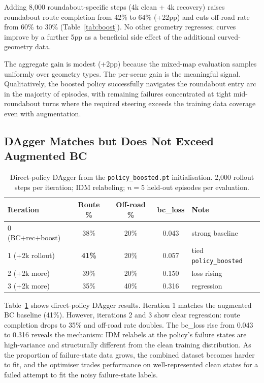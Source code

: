 \documentclass{article}
\begin{document}
Adding 8{,}000 roundabout-specific steps (4k clean + 4k recovery) raises
roundabout route completion from 42\% to 64\% (+22pp) and cuts off-road
rate from 60\% to 30\% (Table~\ref{tab:boost}). No other geometry regresses;
curves improve by a further 5pp as a beneficial side effect of the additional
curved-geometry data.

The aggregate gain is modest (+2pp) because the mixed-map evaluation samples
uniformly over geometry types. The per-scene gain is the meaningful signal.
Qualitatively, the boosted policy successfully navigates the roundabout entry
arc in the majority of episodes, with remaining failures concentrated at
tight mid-roundabout turns where the required steering exceeds the training
data coverage even with augmentation.

\subsection{DAgger Matches but Does Not Exceed Augmented BC}

\begin{table}[t]
\centering
\caption{
  Direct-policy DAgger from the \texttt{policy\_boosted.pt} initialisation.
  2{,}000 rollout steps per iteration; IDM relabeling; $n{=}5$ held-out
  episodes per evaluation.
}
\label{tab:dagger}
\small
\begin{tabular}{lcccl}
\toprule
Iteration & Route \% & Off-road \% & bc\_loss & Note \\
\midrule
0 (BC+rec+boost) & 38\% & 20\% & 0.043 & strong baseline \\
1 (+2k rollout)  & \textbf{41\%} & 20\% & 0.057 & tied \texttt{policy\_boosted} \\
2 (+2k more)     & 39\% & 20\% & 0.150 & loss rising \\
3 (+2k more)     & 35\% & 40\% & 0.316 & regression \\
\bottomrule
\end{tabular}
\end{table}

Table~\ref{tab:dagger} shows direct-policy DAgger results. Iteration 1
matches the augmented BC baseline (41\%). However, iterations 2 and 3 show
clear regression: route completion drops to 35\% and off-road rate doubles.
The bc\_loss rise from 0.043 to 0.316 reveals the mechanism: IDM relabels
at the policy's failure states are high-variance and structurally different
from the clean training distribution. As the proportion of failure-state
data grows, the combined dataset becomes harder to fit, and the optimiser
trades performance on well-represented clean states for a failed attempt to
fit the noisy failure-state labels.
\end{document}
